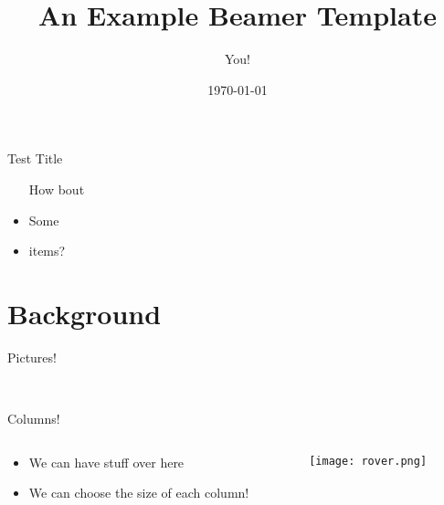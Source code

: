 \documentclass{beamer}
\title[Bottom-right title]{An Example Beamer Template}
\author{You!}
\institute{Colorado School of Mines, probably}
\date{\today}
\begin{document}
\begin{frame}
\titlepage
\end{frame}

 \begin{frame}{Test Title}
\begin{itemize}
\item[How] bout
\item Some
\item items?
\end{itemize}
\end{frame}

\section{Background}
\begin{frame}{Pictures!}
\begin{minipage}{\linewidth}
\\
\end{minipage}
\end{frame}

\begin{frame}{Columns!}

    \begin{columns} %
        \begin{column}{.6\textwidth} %

        \begin{itemize}
          \item We can have stuff over here
          \item We can choose the size of each column!
        \end{itemize}

        \end{column}
        \begin{column}{.4\textwidth} %

        \texttt{[image: rover.png]}

        \end{column}
    \end{columns}

\end{frame}
\end{document}

